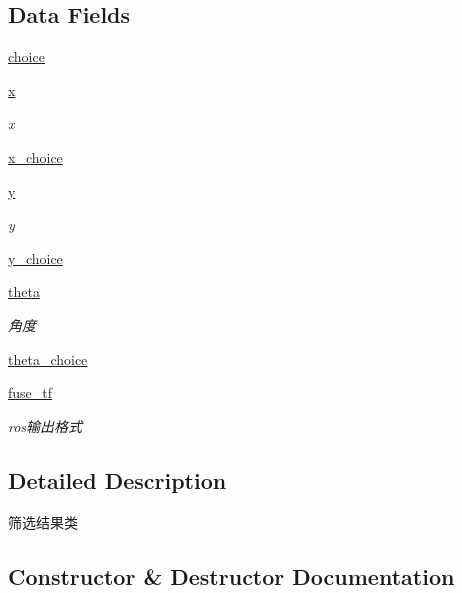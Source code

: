 \subsection*{Data Fields}
\begin{DoxyCompactItemize}
\item 
\hyperlink{classselect___a_1_1_s_e_l_e_c_t_e_d_a668fcdb61eb170589a2f17dc9fd7828e}{choice}
\item 
\hyperlink{classselect___a_1_1_s_e_l_e_c_t_e_d_a122a40eda7d2f01ef7f841e50cc2551a}{x}
\begin{DoxyCompactList}\small\item\em x \end{DoxyCompactList}\item 
\hyperlink{classselect___a_1_1_s_e_l_e_c_t_e_d_aeb92e4a15f07f71b0bc7d3724c6c0ed2}{x\+\_\+choice}
\item 
\hyperlink{classselect___a_1_1_s_e_l_e_c_t_e_d_a10eb0746408bf490fb698405f8c46560}{y}
\begin{DoxyCompactList}\small\item\em y \end{DoxyCompactList}\item 
\hyperlink{classselect___a_1_1_s_e_l_e_c_t_e_d_ab3e66da1bed7279bbc4070a32e59f12d}{y\+\_\+choice}
\item 
\hyperlink{classselect___a_1_1_s_e_l_e_c_t_e_d_a675a284225cd021c81e2d8e681bde862}{theta}
\begin{DoxyCompactList}\small\item\em 角度 \end{DoxyCompactList}\item 
\hyperlink{classselect___a_1_1_s_e_l_e_c_t_e_d_a5776ce390bf47ea20566898027a6217f}{theta\+\_\+choice}
\item 
\hyperlink{classselect___a_1_1_s_e_l_e_c_t_e_d_af9c7a37dba958a7641f253937f45a6d2}{fuse\+\_\+tf}
\begin{DoxyCompactList}\small\item\em ros输出格式 \end{DoxyCompactList}\end{DoxyCompactItemize}


\subsection{Detailed Description}
筛选结果类 



\subsection{Constructor \& Destructor Documentation}
\mbox{\label{classselect___a_1_1_s_e_l_e_c_t_e_d_af17cc2a59273174c7a49668adb3535b3}} 
